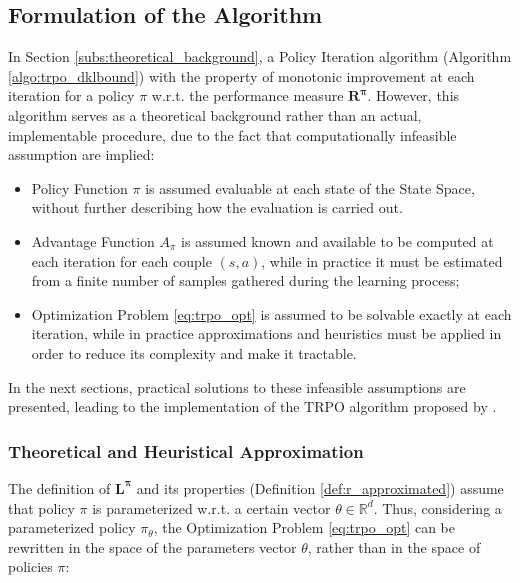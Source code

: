         \subsection{Formulation of the Algorithm}
        \label{subs:trpo_algorithm}
            In Section \ref{subs:theoretical_background}, a Policy Iteration algorithm (Algorithm \ref{algo:trpo_dklbound}) with the property of monotonic improvement at each iteration for a policy $\pi$ w.r.t. the performance measure $\mathbf{R^{\pi}}$. However, this algorithm serves as a theoretical background rather than an actual, implementable procedure, due to the fact that computationally infeasible assumption are implied:
            
            \begin{itemize}
                \item Policy Function $\pi$ is assumed evaluable at each state of the State Space, without further describing how the evaluation is carried out.
                \item Advantage Function $A_{\pi}$ is assumed known and available to be computed at each iteration for each couple $(s, a)$, while in practice it must be estimated from a finite number of samples gathered during the learning process;
                \item Optimization Problem \ref{eq:trpo_opt} is assumed to be solvable exactly at each iteration, while in practice approximations and heuristics must be applied in order to reduce its complexity and make it tractable.
            \end{itemize}
            
            In the next sections, practical solutions to these infeasible assumptions are presented, leading to the implementation of the TRPO algorithm proposed by .
                
            \subsubsection{Theoretical and Heuristical Approximation}
                The definition of $\mathbf{L^{\pi}}$ and its properties (Definition \ref{def:r_approximated}) assume that policy $\pi$ is parameterized w.r.t. a certain vector $\theta \in \mathbb{R}^d$.  Thus, considering a parameterized policy $\pi_{\theta}$, the Optimization Problem \ref{eq:trpo_opt} can be rewritten in the space of the parameters vector $\theta$, rather than in the space of policies $\pi$:
                
